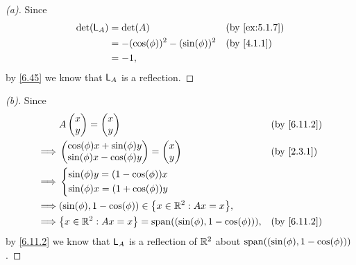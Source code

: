 \begin{proof}[(a)]
  Since
  \begin{align*}
    \det(\L_A) & = \det(A)                          &  & \by{ex:5.1.7} \\
               & = -(\cos(\phi))^2 - (\sin(\phi))^2 &  & \by{4.1.1}    \\
               & = -1,
  \end{align*}
  by \cref{6.45} we know that \(\mathsf{L}_A\) is a reflection.
\end{proof}

\begin{proof}[(b)]
  Since
  \begin{align*}
             & A \begin{pmatrix}
                   x \\
                   y
                 \end{pmatrix} = \begin{pmatrix}
                                   x \\
                                   y
                                 \end{pmatrix}                                 &  & \by{6.11.2} \\
    \implies & \begin{pmatrix}
                 \cos(\phi) x + \sin(\phi) y \\
                 \sin(\phi) x - \cos(\phi) y
               \end{pmatrix} = \begin{pmatrix}
                                 x \\
                                 y
                               \end{pmatrix}                                 &  & \by{2.3.1}    \\
    \implies & \begin{dcases}
                 \sin(\phi) y = (1 - \cos(\phi)) x \\
                 \sin(\phi) x = (1 + \cos(\phi)) y
               \end{dcases}                                                \\
    \implies & (\sin(\phi), 1 - \cos(\phi)) \in \set{x \in \R^2 : Ax = x},                      \\
    \implies & \set{x \in \R^2 : Ax = x} = \spn{(\sin(\phi), 1 - \cos(\phi))}, &  & \by{6.11.2}
  \end{align*}
  by \cref{6.11.2} we know that \(\mathsf{L}_A\) is a reflection of \(\mathbb{R}^2\) about \(\spn{(\sin(\phi), 1 - \cos(\phi))}\).
\end{proof}

